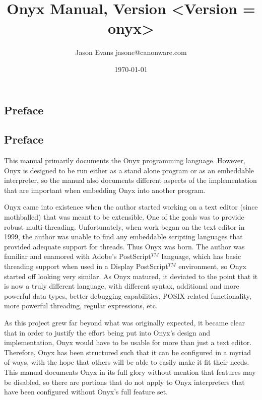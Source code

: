 \documentclass[10pt,titlepage]{book}
\title{Onyx Manual, Version <Version = onyx>}
\author{Jason Evans {\lt}jasone@canonware.com{\gt}}
\date{\today}
\newcommand{\clearemptydoublepage}
	{\newpage \thispagestyle{empty} \cleardoublepage}
\begin{document}
\frontmatter
\pagestyle{plain}
\maketitle

\clearemptydoublepage
\begin{htmlonly}
\part*{Preface}
\end{htmlonly}
\begin{latexonly}
\chapter*{Preface}
\end{latexonly}

This manual primarily documents the Onyx programming language.  However, Onyx is
designed to be run either as a stand alone program or as an embeddable
interpreter, so the manual also documents different aspects of the
implementation that are important when embedding Onyx into another program.

Onyx came into existence when the author started working on a text editor (since
mothballed) that was meant to be extensible.  One of the goals was to provide
robust multi-threading.  Unfortunately, when work began on the text editor in
1999, the author was unable to find any embeddable scripting languages that
provided adequate support for threads.  Thus Onyx was born.  The author was
familiar and enamored with Adobe's PostScript$^{TM}$ language, which has basic
threading support when used in a Display PostScript$^{TM}$ environment, so Onyx
started off looking very similar.  As Onyx matured, it deviated to the point
that it is now a truly different language, with different syntax, additional and
more powerful data types, better debugging capabilities, POSIX-related
functionality, more powerful threading, regular expressions, etc.

As this project grew far beyond what was originally expected, it became clear
that in order to justify the effort being put into Onyx's design and
implementation, Onyx would have to be usable for more than just a text editor.
Therefore, Onyx has been structured such that it can be configured in a myriad
of ways, with the hope that others will be able to easily make it fit their
needs.  This manual documents Onyx in its full glory without mention that
features may be disabled, so there are portions that do not apply to Onyx
interpreters that have been configured without Onyx's full feature set.
\end{document}
